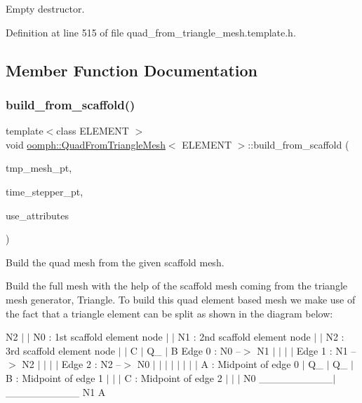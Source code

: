 Empty destructor. 



Definition at line 515 of file quad\+\_\+from\+\_\+triangle\+\_\+mesh.\+template.\+h.



\subsection{Member Function Documentation}
\mbox{\label{classoomph_1_1QuadFromTriangleMesh_ae4146d9e92cce365c292f92fcdc88c47}} 
\subsubsection{\texorpdfstring{build\+\_\+from\+\_\+scaffold()}{build\_from\_scaffold()}}
{\footnotesize\ttfamily template$<$class E\+L\+E\+M\+E\+NT $>$ \\
void \hyperlink{classoomph_1_1QuadFromTriangleMesh}{oomph\+::\+Quad\+From\+Triangle\+Mesh}$<$ E\+L\+E\+M\+E\+NT $>$\+::build\+\_\+from\+\_\+scaffold (\begin{DoxyParamCaption}\item[{Triangle\+Scaffold\+Mesh $\ast$}]{tmp\+\_\+mesh\+\_\+pt,  }\item[{Time\+Stepper $\ast$}]{time\+\_\+stepper\+\_\+pt,  }\item[{const bool \&}]{use\+\_\+attributes }\end{DoxyParamCaption})}



Build the quad mesh from the given scaffold mesh. 

Build the full mesh with the help of the scaffold mesh coming from the triangle mesh generator, Triangle. To build this quad element based mesh we make use of the fact that a triangle element can be split as shown in the diagram below\+:

N2 $\vert$ $\vert$ N0 \+: 1st scaffold element node $\vert$ $\vert$ N1 \+: 2nd scaffold element node $\vert$ $\vert$ N2 \+: 3rd scaffold element node $\vert$ $\vert$ C $\vert$ Q\+\_ $\vert$ B Edge 0 \+: N0 --$>$ N1 $\vert$ $\vert$ $\vert$ $\vert$ Edge 1 \+: N1 --$>$ N2 $\vert$ $\vert$ $\vert$ $\vert$ Edge 2 \+: N2 --$>$ N0 $\vert$ $\vert$ $\vert$ $\vert$ $\vert$ $\vert$ $\vert$ $\vert$ A \+: Midpoint of edge 0 $\vert$ Q\+\_ $\vert$ Q\+\_ $\vert$ B \+: Midpoint of edge 1 $\vert$ $\vert$ $\vert$ C \+: Midpoint of edge 2 $\vert$ $\vert$ $\vert$ N0 \+\_\+\+\_\+\+\_\+\+\_\+\+\_\+\+\_\+\+\_\+\+\_\+\+\_\+\+\_\+$\vert$\+\_\+\+\_\+\+\_\+\+\_\+\+\_\+\+\_\+\+\_\+\+\_\+\+\_\+\+\_\+ N1 A

